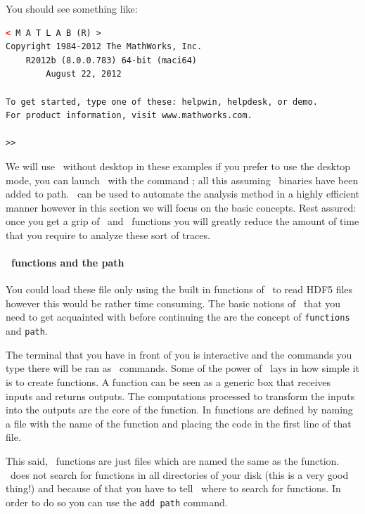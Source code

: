 You should see something like:
\begin{lstlisting}[numbers=none,language=xml]
		< M A T L A B (R) >
Copyright 1984-2012 The MathWorks, Inc.
	R2012b (8.0.0.783) 64-bit (maci64)
		August 22, 2012

To get started, type one of these: helpwin, helpdesk, or demo.
For product information, visit www.mathworks.com.
 
>> 
\end{lstlisting}

We will use \matlab\ without desktop in these examples if you prefer to use the desktop mode, you can launch \matlab\ with the command ; all this assuming \matlab\ binaries have been added to path.
\matlab\ can be used to automate the analysis method in a highly efficient manner however in this section we will focus on the basic concepts. Rest assured: once you get a grip of \matlab\ and \matlab\ functions you will greatly reduce the amount of time that you require to analyze these sort of traces.

\paragraph{\matlab\ functions and the path}

You could load these file only using the built in functions of \matlab\ to read HDF5 files however this would be rather time consuming. The basic notions of \matlab\ that you need to get acquainted with before continuing the are the concept of \texttt{functions} and \texttt{path}.

The terminal that you have in front of you is interactive and the commands you type there will be ran as \matlab\ commands. Some of the power of \matlab\ lays in how simple it is to create functions. A function can be seen as a generic box that receives inputs and returns outputs. The computations processed to transform the inputs into the outputs are the core of the function. In \matlab functions are defined by naming a file with the name of the function and placing the code  in the first line of that file.

This said, \matlab\ functions are just files which are named the same as the function. \matlab\ does not search for functions in all directories of your disk (this is a very good thing!) and because of that you have to tell \matlab\ where to search for functions. In order to do so you can use the \texttt{add path} command. 

